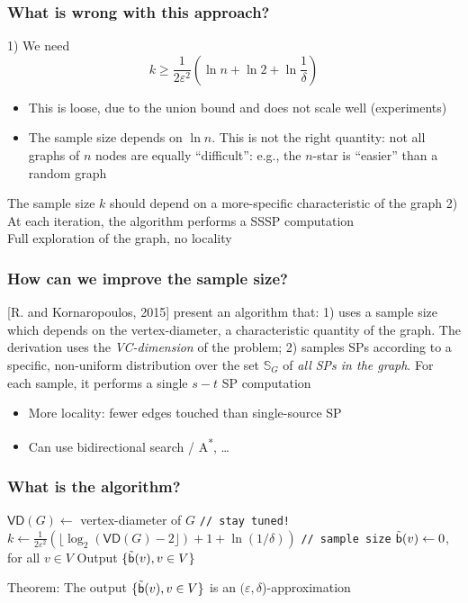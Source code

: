 \begin{frame}
  \frametitle{What is wrong with this approach?}
  1) We need
  \[
    k\ge\frac{1}{2\varepsilon^2}\left(\ln n + \ln 2 +
    \ln\frac{1}{\delta}\right)
  \]
  \begin{itemize}
    \item This is loose, due to the union bound and does not scale well (experiments)
    \item The sample size depends on $\ln n$. This is not the right
      quantity: not all graphs of $n$ nodes are equally ``difficult'': e.g., the $n$-star is ``easier'' than a random graph
  \end{itemize}
  The sample size $k$ should depend on a more-specific characteristic of the graph
  \vfill
  2) At each iteration, the algorithm performs a SSSP computation\\
  \quad Full exploration of the graph, no locality
\end{frame}

\begin{frame}
  \frametitle{How can we improve the sample size?}
  [R. and Kornaropoulos, 2015] present an algorithm that:
  \vfill
  1) uses a sample size which depends on the vertex-diameter, a characteristic
  quantity of the graph. The derivation uses the \emph{VC-dimension} of the
  problem;
  \vfill
  2) samples SPs according to a specific, non-uniform distribution over the set
  $\mathbb{S}_G$ of \emph{all SPs in the graph}. For each sample, it performs a
  single $s-t$ SP computation
  \begin{itemize}
    \item More locality: fewer edges touched than single-source SP
    \item Can use bidirectional search / A\textsuperscript{*},
      \ldots
  \end{itemize}
\end{frame}

\begin{frame}
  \frametitle{What is the algorithm?}
  \begin{algorithm}[H]
    \DontPrintSemicolon
    $\mathsf{VD}(G)\leftarrow$ vertex-diameter of $G$ \texttt{// stay
    tuned!}\;
    $k\leftarrow\frac{1}{2\varepsilon^2}\left(\lfloor\log_2(\mathsf{VD}(G)-2\rfloor)
    +1 + \ln(1/\delta)\right)$ \texttt{// sample size}\;
    $\tilde{\mathsf{b}}(v)\leftarrow 0$, for all $v\in V$\;
    Output $\{\tilde{\mathsf{b}}(v), v\in V\}$
  \end{algorithm}
  Theorem: The output $\{\tilde{\mathsf{b}}(v), v\in V\}$ is an
  $(\varepsilon,\delta$)-approximation
\end{frame}

